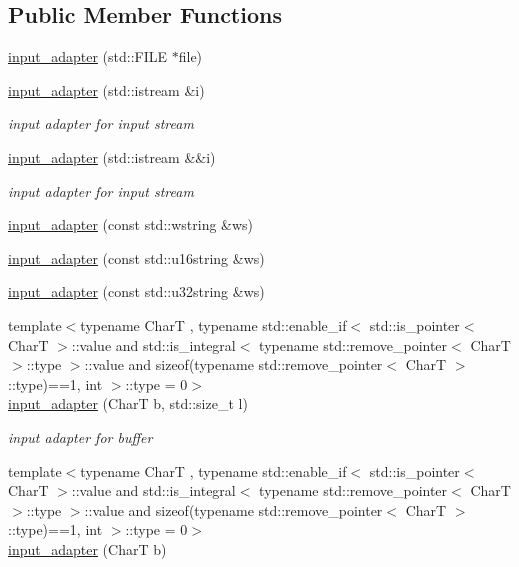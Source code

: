 \subsection*{Public Member Functions}
\begin{DoxyCompactItemize}
\item 
\hyperlink{classnlohmann_1_1detail_1_1input__adapter_a19fb8c28f37b23099a4353acf0a9a2f1}{input\+\_\+adapter} (std\+::\+F\+I\+LE $\ast$file)
\item 
\hyperlink{classnlohmann_1_1detail_1_1input__adapter_ae89f11268d4724b3080473f7218abe86}{input\+\_\+adapter} (std\+::istream \&i)
\begin{DoxyCompactList}\small\item\em input adapter for input stream \end{DoxyCompactList}\item 
\hyperlink{classnlohmann_1_1detail_1_1input__adapter_af002dd2e53ac0855a03cb68d0ce626b2}{input\+\_\+adapter} (std\+::istream \&\&i)
\begin{DoxyCompactList}\small\item\em input adapter for input stream \end{DoxyCompactList}\item 
\hyperlink{classnlohmann_1_1detail_1_1input__adapter_a32f5ddd06562edce43ee86f5b5c2031b}{input\+\_\+adapter} (const std\+::wstring \&ws)
\item 
\hyperlink{classnlohmann_1_1detail_1_1input__adapter_a58163eaa485b17dd878d3c782efc1e43}{input\+\_\+adapter} (const std\+::u16string \&ws)
\item 
\hyperlink{classnlohmann_1_1detail_1_1input__adapter_abe0015ae09e855f502620315b9dcc3db}{input\+\_\+adapter} (const std\+::u32string \&ws)
\item 
{\footnotesize template$<$typename CharT , typename std\+::enable\+\_\+if$<$ std\+::is\+\_\+pointer$<$ Char\+T $>$\+::value and std\+::is\+\_\+integral$<$ typename std\+::remove\+\_\+pointer$<$ Char\+T $>$\+::type $>$\+::value and sizeof(typename std\+::remove\+\_\+pointer$<$ Char\+T $>$\+::type)==1, int $>$\+::type  = 0$>$ }\\\hyperlink{classnlohmann_1_1detail_1_1input__adapter_a37816622d79ab4a1a76f4d7e872b65e1}{input\+\_\+adapter} (CharT b, std\+::size\+\_\+t l)
\begin{DoxyCompactList}\small\item\em input adapter for buffer \end{DoxyCompactList}\item 
{\footnotesize template$<$typename CharT , typename std\+::enable\+\_\+if$<$ std\+::is\+\_\+pointer$<$ Char\+T $>$\+::value and std\+::is\+\_\+integral$<$ typename std\+::remove\+\_\+pointer$<$ Char\+T $>$\+::type $>$\+::value and sizeof(typename std\+::remove\+\_\+pointer$<$ Char\+T $>$\+::type)==1, int $>$\+::type  = 0$>$ }\\\hyperlink{classnlohmann_1_1detail_1_1input__adapter_a86f035d9c4319360014b922b5e433ced}{input\+\_\+adapter} (CharT b)

\end{DoxyCompactItemize}
